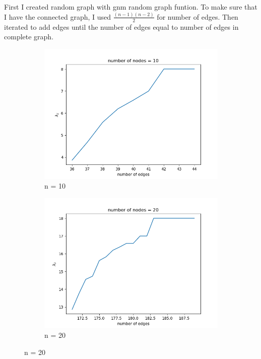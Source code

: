 \documentclass{article}
\begin{document}
\begin{problem}
First I created random graph with gnm random graph funtion. To make sure that I have the connected graph, I used $ \frac{(n-1)(n-2)}{2} $ for number of edges. Then iterated to add edges until the number of edges equal to number of edges in complete graph. 
\begin{figure}[!ht]
    \centering
    \begin{subfigure}{0.35\textwidth}
        \includegraphics[width=\textwidth]{./img/p5_node10.png}
        \caption{n = 10 }
    \end{subfigure}
    \begin{subfigure}{0.35\textwidth}
        \includegraphics[width=\textwidth]{./img/p5_node20.png}
        \caption{n = 20 }
    \end{subfigure}

\end{figure}
\end{problem}
\end{document}
